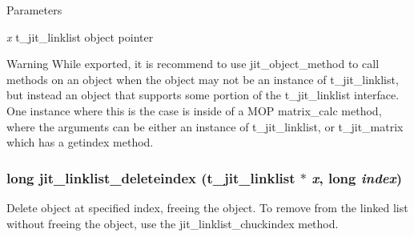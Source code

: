 \begin{DoxyParams}{Parameters}
\item[{\em x}]t\_\-jit\_\-linklist object pointer\end{DoxyParams}
\begin{DoxyWarning}{Warning}
While exported, it is recommend to use jit\_\-object\_\-method to call methods on an object when the object may not be an instance of t\_\-jit\_\-linklist, but instead an object that supports some portion of the t\_\-jit\_\-linklist interface. One instance where this is the case is inside of a MOP matrix\_\-calc method, where the arguments can be either an instance of t\_\-jit\_\-linklist, or t\_\-jit\_\-matrix which has a getindex method. 
\end{DoxyWarning}
\hypertarget{group__linklistmod_ga5939ee7afe931f55c10fe78b4f562b00}{
\subsubsection[{jit\_\-linklist\_\-deleteindex}]{\setlength{\rightskip}{0pt plus 5cm}long jit\_\-linklist\_\-deleteindex (t\_\-jit\_\-linklist $\ast$ {\em x}, \/  long {\em index})}}
\label{group__linklistmod_ga5939ee7afe931f55c10fe78b4f562b00}


Delete object at specified index, freeing the object. To remove from the linked list without freeing the object, use the jit\_\-linklist\_\-chuckindex method.


